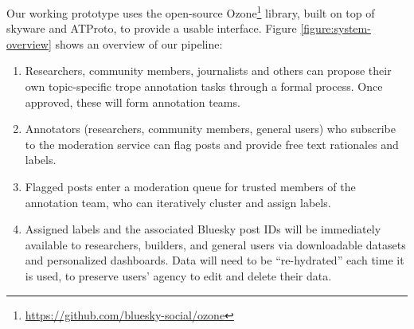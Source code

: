 \documentclass{article} %
\begin{document}






Our working prototype uses the open-source Ozone\footnote{\url{https://github.com/bluesky-social/ozone}} library, built on top of skyware and ATProto, to provide a usable interface.
Figure \ref{figure:system-overview} shows an overview of our pipeline:
\begin{enumerate}
    \item Researchers, community members, journalists and others can propose their own topic-specific trope annotation tasks through a formal process. Once approved, these will form annotation teams.
    \item Annotators (researchers, community members, general users) who subscribe to the moderation service can flag posts and provide free text rationales and labels.
    \item Flagged posts enter a moderation queue for trusted members of the annotation team, who can iteratively cluster and assign labels.
    \item Assigned labels and the associated Bluesky post IDs will be immediately available to researchers, builders, and general users via downloadable datasets and personalized dashboards. Data will need to be ``re-hydrated'' each time it is used, to preserve users' agency to edit and delete their data.
\end{enumerate}
\end{document}
